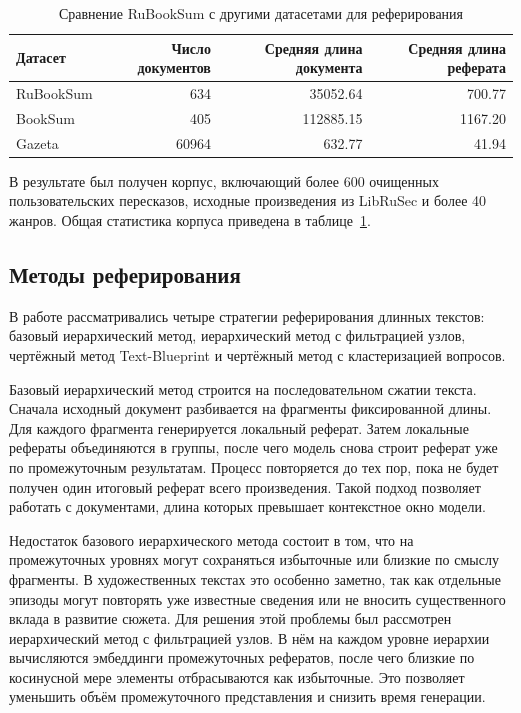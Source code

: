 \documentclass[oneside,senior,etd]{BYUPhys}
\begin{document}
\begin{table}[h]
    \centering
    \small
    \begin{tabular}{lrrr}
        \toprule
        \textbf{Датасет} & \textbf{Число документов} & \textbf{Средняя длина документа} & \textbf{Средняя длина реферата} \\
        \midrule
        RuBookSum & 634 & 35052.64 & 700.77 \\
        BookSum & 405 & 112885.15 & 1167.20 \\
        Gazeta & 60964 & 632.77 & 41.94     \\
        \bottomrule
    \end{tabular}
    \caption{Сравнение RuBookSum с другими датасетами для реферирования}
    \label{tab:rubooksum_dataset_overview}
\end{table}


В результате был получен корпус, включающий более 600 очищенных пользовательских пересказов, 
исходные произведения из LibRuSec и более 40 жанров. 
Общая статистика корпуса приведена в таблице~\ref{tab:rubooksum_dataset_overview}.

\subsection{Методы реферирования}

В работе рассматривались четыре стратегии реферирования длинных текстов: 
базовый иерархический метод, иерархический метод с фильтрацией узлов, чертёжный метод Text-Blueprint и чертёжный метод с кластеризацией вопросов.

Базовый иерархический метод строится на последовательном сжатии текста. 
Сначала исходный документ разбивается на фрагменты фиксированной длины. 
Для каждого фрагмента генерируется локальный реферат. 
Затем локальные рефераты объединяются в группы, после чего модель снова строит реферат уже по промежуточным результатам. 
Процесс повторяется до тех пор, пока не будет получен один итоговый реферат всего произведения. 
Такой подход позволяет работать с документами, длина которых превышает контекстное окно модели.

Недостаток базового иерархического метода состоит в том, что на промежуточных уровнях могут сохраняться избыточные или близкие по смыслу фрагменты. 
В художественных текстах это особенно заметно, так как отдельные эпизоды могут повторять уже известные сведения или не вносить существенного вклада в развитие сюжета. 
Для решения этой проблемы был рассмотрен иерархический метод с фильтрацией узлов. В нём на каждом уровне иерархии вычисляются эмбеддинги промежуточных рефератов, после чего близкие по косинусной мере элементы отбрасываются как избыточные. 
Это позволяет уменьшить объём промежуточного представления и снизить время генерации.
\end{document}
